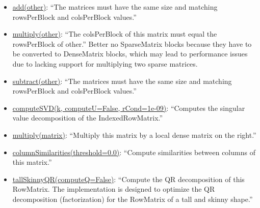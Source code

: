 \documentclass{prog_report}
\begin{document}
\begin{itemize}
    \item
    \href{https://spark.apache.org/docs/2.4.2/api/python/pyspark.mllib.html\#pyspark.mllib.linalg.distributed.BlockMatrix.add}{add(other)}:
    ``The matrices must have the same size and matching rowsPerBlock and
    colsPerBlock values.''
    \item
    \href{https://spark.apache.org/docs/2.4.2/api/python/pyspark.mllib.html\#pyspark.mllib.linalg.distributed.BlockMatrix.multiply}{multiply(other)}:
    ``The colsPerBlock of this matrix must equal the rowsPerBlock of
    other.'' Better no SparseMatrix blocks because they have to be
    converted to DenseMatrix blocks, which may lead to performance
    issues due to lacking support for multiplying two sparse matrices.
    \item
    \href{https://spark.apache.org/docs/2.4.2/api/python/pyspark.mllib.html\#pyspark.mllib.linalg.distributed.BlockMatrix.subtract}{subtract(other)}:
    ``The matrices must have the same size and matching rowsPerBlock and
    colsPerBlock values.''
    \item
    \href{https://spark.apache.org/docs/2.4.2/api/python/pyspark.mllib.html\#pyspark.mllib.linalg.distributed.IndexedRowMatrix.computeSVD}{computeSVD(k,
        computeU=False, rCond=1e-09)}: ``Computes the singular value
    decomposition of the IndexedRowMatrix.''
    \item
    \href{https://spark.apache.org/docs/2.4.2/api/python/pyspark.mllib.html\#pyspark.mllib.linalg.distributed.IndexedRowMatrix.multiply}{multiply(matrix)}:
    ``Multiply this matrix by a local dense matrix on the right.''
    \item
    \href{https://spark.apache.org/docs/2.4.2/api/python/pyspark.mllib.html\#pyspark.mllib.linalg.distributed.RowMatrix.columnSimilarities}{columnSimilarities(threshold=0.0)}:
    ``Compute similarities between columns of this matrix.''
    \item
    \href{https://spark.apache.org/docs/2.4.2/api/python/pyspark.mllib.html\#pyspark.mllib.linalg.distributed.RowMatrix.tallSkinnyQR}{tallSkinnyQR(computeQ=False)}:
    ``Compute the QR decomposition of this RowMatrix. The implementation
    is designed to optimize the QR decomposition (factorization) for the
    RowMatrix of a tall and skinny shape.''
\end{itemize}
\end{document}
